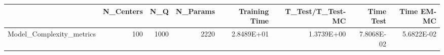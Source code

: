 \begin{tabular}{lrrrrrrr}
\toprule
{} &  N\_Centers &   N\_Q &  N\_Params &  Training Time &  T\_Test/T\_Test-MC &  Time Test &  Time EM-MC \\
\midrule
Model\_Complexity\_metrics &        100 &  1000 &      2220 &     2.8489E+01 &        1.3739E+00 & 7.8068E-02 &  5.6822E-02 \\
\bottomrule
\end{tabular}
